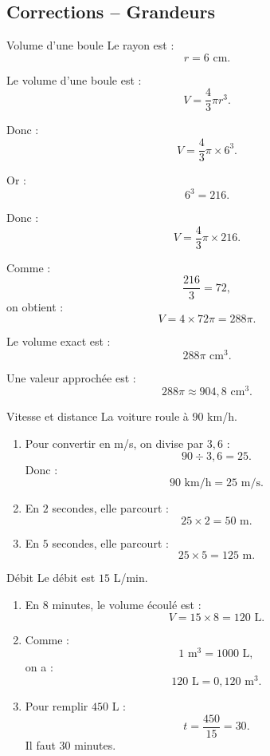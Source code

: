 \documentclass[11pt,a4paper]{article}
\begin{document}
\subsection{Corrections -- Grandeurs}

\begin{correctionbox}{Volume d'une boule}
Le rayon est :
\[
r=6\text{ cm}.
\]

Le volume d'une boule est :
\[
V=\frac{4}{3}\pi r^3.
\]

Donc :
\[
V=\frac{4}{3}\pi\times 6^3.
\]

Or :
\[
6^3=216.
\]

Donc :
\[
V=\frac{4}{3}\pi\times 216.
\]

Comme :
\[
\frac{216}{3}=72,
\]
on obtient :
\[
V=4\times 72\pi=288\pi.
\]

Le volume exact est :
\[
288\pi\text{ cm}^3.
\]

Une valeur approchée est :
\[
288\pi\approx 904{,}8\text{ cm}^3.
\]
\end{correctionbox}

\begin{correctionbox}{Vitesse et distance}
La voiture roule à $90$ km/h.

\begin{enumerate}
    \item Pour convertir en m/s, on divise par $3{,}6$ :
    \[
    90\div 3{,}6=25.
    \]
    Donc :
    \[
    90\text{ km/h}=25\text{ m/s}.
    \]
    
    \item En $2$ secondes, elle parcourt :
    \[
    25\times 2=50\text{ m}.
    \]
    
    \item En $5$ secondes, elle parcourt :
    \[
    25\times 5=125\text{ m}.
    \]
\end{enumerate}
\end{correctionbox}

\begin{correctionbox}{Débit}
Le débit est $15$ L/min.

\begin{enumerate}
    \item En $8$ minutes, le volume écoulé est :
    \[
    V=15\times 8=120\text{ L}.
    \]
    
    \item Comme :
    \[
    1\text{ m}^3=1000\text{ L},
    \]
    on a :
    \[
    120\text{ L}=0{,}120\text{ m}^3.
    \]
    
    \item Pour remplir $450$ L :
    \[
    t=\frac{450}{15}=30.
    \]
    Il faut $30$ minutes.
\end{enumerate}
\end{correctionbox}
\end{document}
